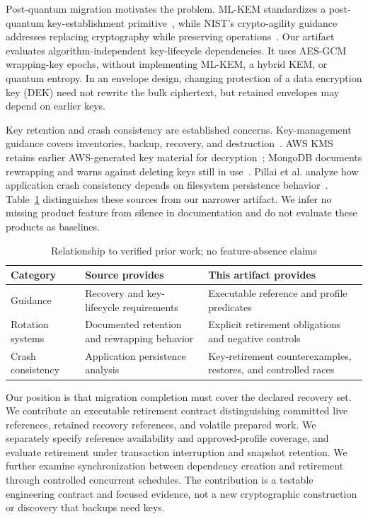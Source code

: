 \documentclass[10pt,conference]{IEEEtran}
\begin{document}
Post-quantum migration motivates the problem. ML-KEM standardizes a post-quantum key-establishment primitive~\cite{fips203}, while NIST's crypto-agility guidance addresses replacing cryptography while preserving operations~\cite{agility}. Our artifact evaluates algorithm-independent key-lifecycle dependencies. It uses AES-GCM wrapping-key epochs, without implementing ML-KEM, a hybrid KEM, or quantum entropy. In an envelope design, changing protection of a data encryption key (DEK) need not rewrite the bulk ciphertext, but retained envelopes may depend on earlier keys.

Key retention and crash consistency are established concerns. Key-management guidance covers inventories, backup, recovery, and destruction~\cite{keymgmt}. AWS KMS retains earlier AWS-generated key material for decryption~\cite{aws}; MongoDB documents rewrapping and warns against deleting keys still in use~\cite{mongo}. Pillai et al. analyze how application crash consistency depends on filesystem persistence behavior~\cite{pillai}. Table~\ref{tab:related} distinguishes these sources from our narrower artifact. We infer no missing product feature from silence in documentation and do not evaluate these products as baselines.

\begin{table}[t]
\caption{Relationship to verified prior work; no feature-absence claims}
\label{tab:related}\centering
\begin{tabular}{@{}p{2.15cm}p{2.7cm}p{2.95cm}@{}}
\toprule
Category & Source provides & This artifact provides\\
\midrule
Guidance~\cite{storage,keymgmt} & Recovery and key-lifecycle requirements & Executable reference and profile predicates\\
Rotation systems~\cite{aws,mongo} & Documented retention and rewrapping behavior & Explicit retirement obligations and negative controls\\
Crash consistency~\cite{pillai} & Application persistence analysis & Key-retirement counterexamples, restores, and controlled races\\
\bottomrule
\end{tabular}
\end{table}

Our position is that migration completion must cover the declared recovery set. We contribute an executable retirement contract distinguishing committed live references, retained recovery references, and volatile prepared work. We separately specify reference availability and approved-profile coverage, and evaluate retirement under transaction interruption and snapshot retention. We further examine synchronization between dependency creation and retirement through controlled concurrent schedules. The contribution is a testable engineering contract and focused evidence, not a new cryptographic construction or discovery that backups need keys.
\end{document}
